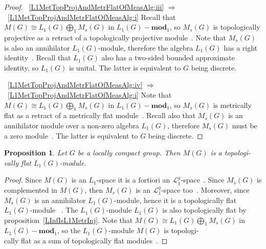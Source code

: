 \documentclass{article}
\theoremstyle{plain}
\newtheorem{proposition}{Proposition}[section]
\theoremstyle{definition}
\newtheorem{proof}{Proof}\def\theproof{}
\newcommand{\isom}{\mathop{\mathbin{\cong}}}
\begin{document}
\begin{fulltext}
\begin{proof}
~\ref{L1MetTopProjAndMetrFlatOfMeasAlg:iii}
$\Longrightarrow$~\ref{L1MetTopProjAndMetrFlatOfMeasAlg:i} Recall that
$M(G)\isom L_1(G)\bigoplus_1 M_s(G)$ in $L_1(G)-\mathbf{mod}_1$, so $M_s(G)$ is
topologically projective as a retract of a topologically projective
module~\cite[proposition 2.2]{NemGeomProjInjFlatBanMod}. Note that $M_s(G)$ is
also an annihilator $L_1(G)$-module, therefore the algebra $L_1(G)$ has a right
identity~\cite[proposition 3.3]{NemGeomProjInjFlatBanMod}. Recall that $L_1(G)$
also has a two-sided bounded approximate identity, so $L_1(G)$ is unital. The
latter is equivalent to $G$ being discrete.

~\ref{L1MetTopProjAndMetrFlatOfMeasAlg:iv}
$\Longrightarrow$~\ref{L1MetTopProjAndMetrFlatOfMeasAlg:i} Note that $M(G)\isom
L_1(G)\bigoplus_1 M_s(G)$ in $L_1(G)-\mathbf{mod}_1$, so $M_s(G)$ is metrically
flat as a retract of a metrically flat module~\cite[proposition
2.27]{NemGeomProjInjFlatBanMod}. Recall also that $M_s(G)$ is an annihilator
module over a non-zero algebra $L_1(G)$, therefore $M_s(G)$ must be a zero
module~\cite[proposition 3.6]{NemGeomProjInjFlatBanMod}. The latter is
equivalent to $G$ being discrete.
\end{proof}

\begin{proposition}\label{MeasAlgIsL1TopFlat} Let $G$ be a locally compact
group. Then $M(G)$ is a topologi-\\cally flat $L_1(G)$-module.
\end{proposition}
\begin{proof} Since $M(G)$ is an $L_1$-space it is a fortiori an
$\mathcal{L}_1^g$-space~\cite[paragraph 3.13, exercise
4.7(b)]{DefFloTensNorOpId}. Since $M_s(G)$ is complemented in $M(G)$, then
$M_s(G)$ is an $\mathcal{L}_1^g$-space too~\cite[corollary
23.2.1(2)]{DefFloTensNorOpId}. Moreover, since $M_s(G)$ is an annihilator
$L_1(G)$-module, hence it is a topologically flat $L_1(G)$-module
~\cite[proposition 3.6]{NemGeomProjInjFlatBanMod}. The $L_1(G)$-module $L_1(G)$
is also topologically flat by proposition~\ref{LInfIsL1MetrInj}. Note that
$M(G)\isom L_1(G)\bigoplus_1 M_s(G)$ in $L_1(G)-\mathbf{mod}_1$, so the
$L_1(G)$-module $M(G)$ is topologi-\\cally flat as a sum of topologically flat
modules~\cite[proposition 2.27]{NemGeomProjInjFlatBanMod}.
\end{proof}



\end{fulltext}
\end{document}

